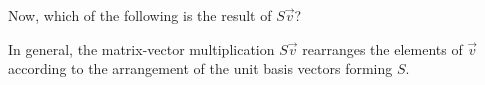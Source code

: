 \documentclass{ximera}
\begin{document}
\begin{exercise}
  Now, which of the following is the result of $S \vec{v}$?
  \begin{multipleChoice}
  \end{multipleChoice}

  \begin{feedback}[correct]
    In general, the matrix-vector multiplication $S \vec{v}$
    rearranges the elements of $\vec{v}$ according to the arrangement
    of the unit basis vectors forming $S$.
  \end{feedback}
\end{exercise}
\end{document}
